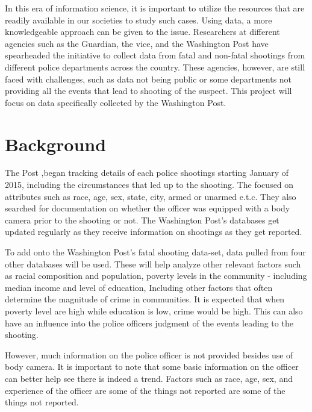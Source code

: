 \documentclass[a4paper,12pt]{article}
\begin{document}
In this era of information science, it is important to utilize the resources that are readily available in our societies to study such cases. Using data, a more knowledgeable approach can be given to the issue. Researchers at different agencies such as the Guardian, the vice, and the Washington Post have spearheaded the initiative to collect data from fatal and non-fatal shootings from different police departments across the country. These agencies, however, are still faced with challenges, such as data not being public or some departments not providing all the events that lead to shooting of the suspect. This project will focus on data specifically collected by the Washington Post\cite{fatal_force}.

\section{Background}
The Post \cite{washington_post},began tracking details of each police shootings starting January of 2015, including the circumstances that led up to the shooting. The focused on attributes such as race, age, sex, state, city, armed or unarmed e.t.c. They also searched for documentation on whether the officer was equipped with a body camera prior to the shooting or not. The Washington Post's databases get updated regularly as they receive information on shootings as they get reported.

To add onto the Washington Post's fatal shooting data-set, data pulled from four other databases will be used. These will help analyze other relevant factors such as racial composition and population, poverty levels in the community - including median income and level of education, Including other factors that often determine the magnitude of crime in communities. It is expected that when poverty level are high while education is low, crime would be high. This can also have an influence into the police officers judgment of the events leading to the shooting\cite{deadly_force}. 

However, much information on the police officer is not provided besides use of body camera. It is important to note that some basic information on the officer can better help see there is indeed a trend. Factors such as race, age, sex, and experience of the officer are some of the things not reported are some of the things not reported.
\end{document}
